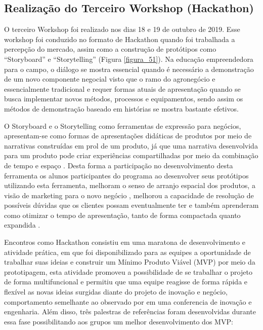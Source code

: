 \subsection{Realização do Terceiro Workshop (Hackathon)}

O terceiro Workshop foi realizado nos dias 18 e 19 de outubro de 2019. Esse workshop foi conduzido no formato de Hackathon quando foi trabalhada a percepção do mercado, assim como a construção de protótipos como “Storyboard” e “Storytelling” (Figura \ref{figura_51}). Na educação empreendedora para o campo, o diálogo se mostra essencial quando é necessário a demonstração de um novo componente negocial visto que o ramo do agronegócio e essencialmente tradicional e requer formas atuais de apresentação quando se busca implementar novos métodos, processos e equipamentos, sendo assim os métodos de demonstração baseado em histórias se mostra bastante efetivos. 

O Storyboard e o Storytelling como ferramentas de expressão para negócios, apresentam-se como formas de apresentações  didáticas de produtos por meio de narrativas construídas em prol de um produto, já que uma  narrativa desenvolvida para um produto pode criar experiências compartilhadas por meio da combinação de tempo e espaço \cite{langellier_storytelling_2004}. Desta forma a participação no desenvolvimento desta ferramenta os alunos participantes do programa ao desenvolver seus protótipos utilizando esta ferramenta, melhoram o senso de arranjo espacial dos produtos, a visão de marketing para o novo negócio \cite{brenes_improving_2019,brenes_improving_2019}, melhorou a capacidade de resolução de possíveis dúvidas que os clientes possam eventualmente ter e também aprenderam como otimizar o tempo de apresentação, tanto de forma compactada quanto expandida \cite{wahid_storyboard_2018,wu-rorrer_filling_2017}.

Encontros como Hackathon consistiu em uma maratona de desenvolvimento e atividade prática, em que foi disponibilizado para as equipes a oportunidade de trabalhar suas ideias e construir um Mínimo Produto Viável (MVP) por meio da prototipagem, esta atividade promoveu a possibilidade de se trabalhar o projeto de forma multifuncional e permitiu que uma equipe reagisse de forma rápida e flexível as novas ideias surgidas diante do projeto de inovação e negócio, comportamento semelhante ao observado por  em uma conferencia de inovação e engenharia. Além disso, três palestras de referências foram desenvolvidas durante essa fase possibilitando aos grupos um melhor desenvolvimento dos MVP:

